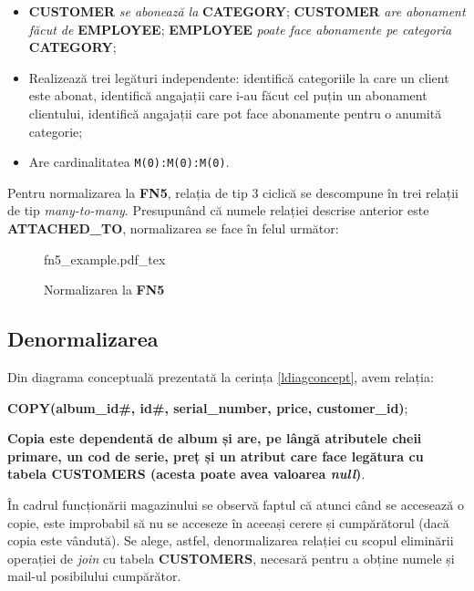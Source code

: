 \documentclass[a4paper, oneside, 12pt]{article}
\newcommand{\incfig}[1]{%
    \def\svgwidth{\columnwidth}
    {#1.pdf_tex}
}
\begin{document}
\begin{itemize}[label=\textbullet, noitemsep, topsep=0pt, after=]
        \item \textbf{CUSTOMER} \emph{se abonează la} \textbf{CATEGORY};
              \textbf{CUSTOMER} \emph{are abonament făcut de} \textbf{EMPLOYEE};
              \textbf{EMPLOYEE} \emph{poate face abonamente pe categoria} \textbf{CATEGORY};
        \item Realizează trei legături independente: identifică
              categoriile la care un client este abonat, identifică
              angajații care i-au făcut cel puțin un abonament
              clientului, identifică angajații care pot face
              abonamente pentru o anumită categorie;
        \item Are cardinalitatea \texttt{M(0):M(0):M(0)}.

\end{itemize}

Pentru normalizarea la \textbf{FN5}, relația de tip 3 ciclică se
descompune în trei relații de tip \emph{many-to-many}. Presupunând că numele relației descrise
anterior este \textbf{ATTACHED\_TO}, normalizarea se face în felul următor:

\begin{figure}[H]
    \centering
    \incfig{fn5_example}
    \caption{Normalizarea la \textbf{FN5}}
    \label{fig:norm5}
\end{figure}

\subsection{Denormalizarea}

Din diagrama conceptuală prezentată la cerința \ref{ldiagconcept}, avem relația:

\begin{m_itemize}[after=]
        \item \textbf{COPY(album\_id\#, id\#, serial\_number, price, customer\_id)};
        \item \textbf{Copia este dependentă de album și are, pe lângă
              atributele cheii primare, un cod de serie, preț și un atribut
              care face legătura cu tabela CUSTOMERS (acesta poate avea valoarea
\emph{null})}.
\end{m_itemize}

În cadrul funcționării magazinului se observă faptul că atunci când se
accesează o copie, este improbabil să nu se acceseze în aceeași cerere și
cumpărătorul (dacă copia este vândută). Se alege, astfel, denormalizarea
relației cu scopul eliminării operației de \emph{join} cu tabela
\textbf{CUSTOMERS}, necesară pentru a obține numele și mail-ul posibilului
cumpărător.
\end{document}
